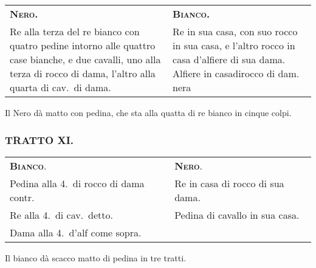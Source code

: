 \documentclass[11pt,a6paper]{article}
\begin{document}
{\small
\noindent\begin{tabular}{@{}p{3.84cm}p{3.84cm}}
{\bfseries\scshape Nero.} & {\bfseries\scshape Bianco.} \\
Re alla terza del re bianco con quatro pedine
intorno alle quattro case bianche, e due cavalli, uno alla terza di rocco di dama, l'altro alla quarta di cav.\ di dama. &

Re in sua casa, con suo
rocco in sua casa, e l'altro rocco in casa d'alfiere di sua dama. Alfiere
in casadirocco di dam. nera\\
\end{tabular}
}


Il Nero dà matto con pedina, che sta alla quatta di
re bianco in cinque colpi.


\subsubsection{TRATTO XI.}

{\small
\noindent\begin{tabular}{@{}p{3.84cm}p{3.84cm}}
{\bfseries\scshape Bianco}. & {\bfseries\scshape Nero}.\\
Pedina alla 4.\ di rocco di dama contr.& Re in casa di rocco di sua dama.\\
Re alla 4.\ di cav.\ detto.& Pedina di cavallo in sua casa.\\
Dama alla 4.\ d'alf come sopra.&
\end{tabular}
}

Il bianco dà scacco matto di pedina in tre tratti.

\end{document}
